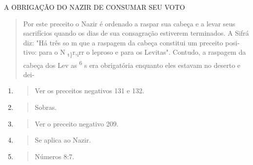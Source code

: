 A OBRIGAÇÃO DO NAZIR DE CONSUMAR SEU VOTO

\begin{quote}
Por este preceito o Nazir é ordenado a raspar sua cabeça e a levar seus
sacrifícios quando os dias de sua consagração estiverem terminados. A
Si­frá diz: "Há três so m que a raspagem da cabeça constitui um preceito
posi­tivo: para o N \textsubscript{t\}}r,\textsubscript{i}rr o leproso e
para os Levitas". Contudo, a raspagem da cabeça dos Lev as
\textsuperscript{6} s era obrigatória enquanto eles estavam no deserto e
dei-
\end{quote}

\begin{enumerate}
\def\labelenumi{\arabic{enumi}.}
\setcounter{enumi}{121}
\item
  \begin{quote}
  Ver os preceitos negativos 131 e 132.
  \end{quote}
\item
  \begin{quote}
  Sobras.
  \end{quote}
\item
  \begin{quote}
  Ver o preceito negativo 209.
  \end{quote}
\item
  \begin{quote}
  Se aplica ao Nazir.
  \end{quote}
\item
  \begin{quote}
  Números 8:7.
  \end{quote}
\end{enumerate}

